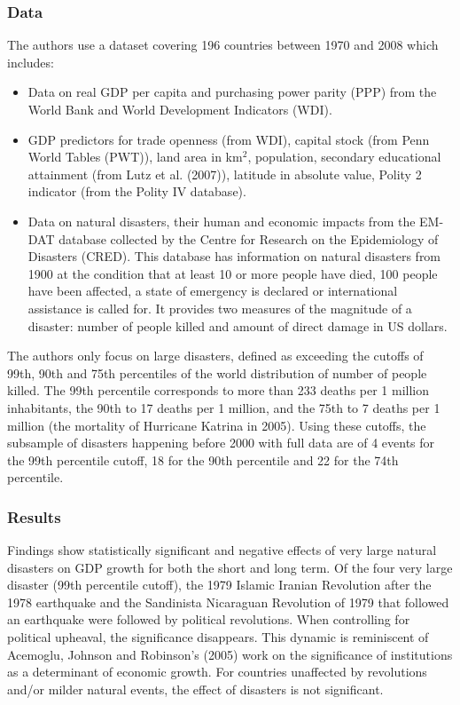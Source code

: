 \documentclass[12pt,a4paper,draft]{article}
\begin{document}
\subsubsection{Data}
The authors use a dataset covering 196 countries between 1970 and 2008 which includes:
\begin{itemize}
    \item Data on real GDP per capita and purchasing power parity (PPP) from the World 
    Bank and World Development Indicators (WDI).
    \item GDP predictors for trade openness (from WDI), capital stock (from Penn World 
    Tables (PWT)), land area in km$^2$, population, secondary educational attainment 
    (from Lutz et al. (2007)), latitude in absolute value, Polity 2 indicator (from 
    the Polity IV database).
    \item Data on natural disasters, their human and economic impacts from the EM-DAT 
    database collected by the Centre for Research on the Epidemiology of Disasters (CRED). 
    This database has information on natural disasters from 1900 at the condition that 
    at least 10 or more people have died, 100 people have been affected, a state of 
    emergency is declared or international assistance is called for. It provides two measures 
    of the magnitude of a disaster: number of people killed and amount of direct damage in 
    US dollars.
     
\end{itemize}

The authors only focus on large disasters, defined as exceeding the cutoffs of 99th, 90th 
and 75th percentiles of the world distribution of number of people killed. The 99th percentile 
corresponds to more than 233 deaths per 1 million inhabitants, the 90th to 17 deaths per 1 
million, and the 75th to 7 deaths per 1 million (the mortality of Hurricane Katrina in 2005).
Using these cutoffs, the subsample of disasters happening before 2000 with full data are of 4 
events for the 99th percentile cutoff, 18 for the 90th percentile and 22 for the 74th percentile.


\subsubsection{Results}
Findings show statistically significant and negative effects of very large natural disasters 
on GDP growth for both the short and long term. 
Of the four very large disaster (99th percentile cutoff), the 1979 Islamic Iranian Revolution 
after the 1978 earthquake and the Sandinista Nicaraguan Revolution of 1979 that followed an 
earthquake were followed by political revolutions.
When controlling for political upheaval, the significance disappears. This dynamic is reminiscent 
of Acemoglu, Johnson and Robinson's (2005) work on the significance of institutions as a 
determinant of economic growth.
For countries unaffected by revolutions and/or milder natural events, the effect of disasters 
is not significant. 
\end{document}
